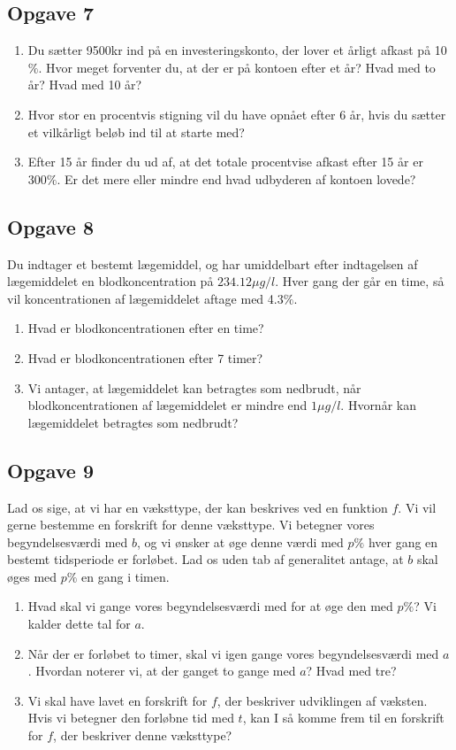 \subsection*{Opgave 7}
\begin{enumerate}[label=\roman*)]
	\item Du sætter 9500kr ind på en investeringskonto, der lover et årligt afkast på 10$\%$. Hvor meget forventer du,
	 at der er på kontoen efter et år? Hvad med to år? Hvad med 10 år?
	\item Hvor stor en procentvis stigning vil du have opnået efter 6 år, hvis du sætter et vilkårligt beløb ind til at
	starte med?
	\item Efter 15 år finder du ud af, at det totale procentvise afkast efter 15 år er $300\%$. Er det mere eller mindre 
	end hvad udbyderen af kontoen lovede?
\end{enumerate}

\subsection*{Opgave 8}
Du indtager et bestemt lægemiddel, og har umiddelbart efter indtagelsen af lægemiddelet en blodkoncentration 
	på $234.12 \mu g / l$. Hver gang der går en time, så vil koncentrationen af lægemiddelet aftage med 4.3$\%$. 
\begin{enumerate}[label=\roman*)]
	\item Hvad er blodkoncentrationen efter en time? 
	\item Hvad er blodkoncentrationen efter 7 timer?
	\item Vi antager, at lægemiddelet kan betragtes som nedbrudt, når blodkoncentrationen af lægemiddelet er mindre end
	 $1\mu g/l$. Hvornår kan lægemiddelet betragtes som nedbrudt?
\end{enumerate}

\subsection*{Opgave 9}
Lad os sige, at vi har en væksttype, der kan beskrives ved en funktion $f$. Vi vil gerne bestemme en forskrift for denne væksttype. Vi betegner vores begyndelsesværdi med $b$, og vi ønsker at øge denne værdi med $p\%$ hver gang en bestemt tidsperiode er forløbet. Lad os uden tab af generalitet antage, at $b$ skal øges med $p\%$ en gang i timen. 
\begin{enumerate}[label=\roman*)]
	\item Hvad skal vi gange vores begyndelsesværdi med for at øge den med $p\%$? Vi kalder dette tal for $a$.
	\item Når der er forløbet to timer, skal vi igen gange vores begyndelsesværdi med $a$. Hvordan noterer vi,
	at der ganget to gange med $a$? Hvad med tre?
	\item Vi skal have lavet en forskrift for $f$, der beskriver udviklingen af væksten. Hvis vi betegner 
	den forløbne tid med $t$, kan I så komme frem til en forskrift for $f$, der beskriver denne væksttype?
\end{enumerate}
